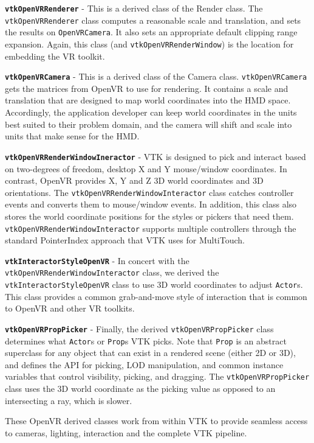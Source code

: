 \textbf{\texttt{vtkOpenVRRenderer}} - This is a derived class of the Render class.
The \texttt{vtkOpenVRRenderer} class computes a reasonable scale and translation, and sets the results on \texttt{OpenVRCamera}.
It also sets an appropriate default clipping range expansion.
Again, this class (and \texttt{vtkOpenVRRenderWindow}) is the location for embedding the VR toolkit.

\textbf{\texttt{vtkOpenVRCamera}} - This is a derived class of the Camera class. \texttt{vtkOpenVRCamera} gets the matrices from OpenVR to use for rendering.
It contains a scale and translation that are designed to map world coordinates into the HMD space.
Accordingly, the application developer can keep world coordinates in the units best suited to their problem domain, and the camera will shift and scale into units that make sense for the HMD.

\textbf{\texttt{vtkOpenVRRenderWindowIneractor}} - VTK is designed to pick and interact based on two-degrees of freedom, desktop X and Y mouse/window coordinates.
In contrast, OpenVR provides X, Y and Z 3D world coordinates and 3D orientations.
The \texttt{vtkOpenVRRenderWindowInteractor} class catches controller events and converts them to mouse/window events.
In addition, this class also stores the world coordinate positions for the styles or pickers that need them.
\texttt{vtkOpenVRRenderWindowInteractor} supports multiple controllers through the standard PointerIndex approach that VTK uses for MultiTouch.

\textbf{\texttt{vtkInteractorStyleOpenVR}} - In concert with the \texttt{vtkOpenVRRenderWindowInteractor} class, we derived the \texttt{vtkInteractorStyleOpenVR} class
to use 3D world coordinates to adjust \texttt{Actor}s.
This class provides a common grab-and-move style of interaction that is common to OpenVR and other VR toolkits.

\textbf{\texttt{vtkOpenVRPropPicker}} - Finally, the derived \texttt{vtkOpenVRPropPicker} class determines what \texttt{Actor}s or \texttt{Prop}s VTK picks.
Note that \texttt{Prop} is an abstract superclass for any object that can exist in a rendered scene (either 2D or 3D), and defines the API for picking, LOD manipulation, and common instance variables that control visibility, picking, and dragging.
The \texttt{vtkOpenVRPropPicker} class uses the 3D world coordinate as the picking value as opposed to an intersecting a ray, which is slower.

These OpenVR derived classes work from within VTK to provide seamless access to cameras, lighting, interaction and the complete VTK pipeline.

